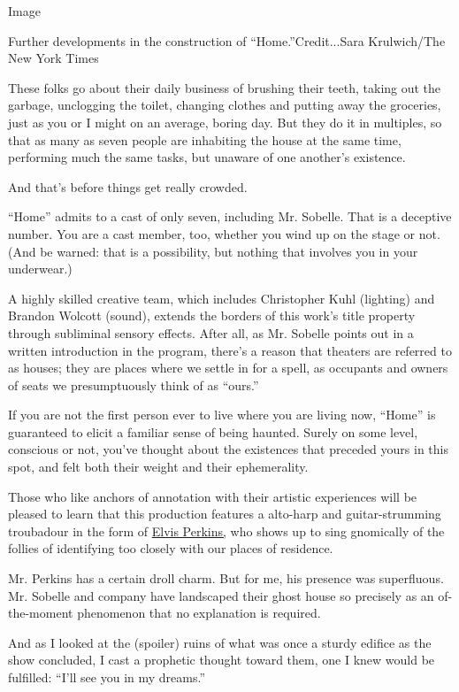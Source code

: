 Image

Further developments in the construction of ``Home.''Credit...Sara
Krulwich/The New York Times

These folks go about their daily business of brushing their teeth,
taking out the garbage, unclogging the toilet, changing clothes and
putting away the groceries, just as you or I might on an average, boring
day. But they do it in multiples, so that as many as seven people are
inhabiting the house at the same time, performing much the same tasks,
but unaware of one another's existence.

And that's before things get really crowded.

``Home'' admits to a cast of only seven, including Mr. Sobelle. That is
a deceptive number. You are a cast member, too, whether you wind up on
the stage or not. (And be warned: that is a possibility, but nothing
that involves you in your underwear.)

A highly skilled creative team, which includes Christopher Kuhl
(lighting) and Brandon Wolcott (sound), extends the borders of this
work's title property through subliminal sensory effects. After all, as
Mr. Sobelle points out in a written introduction in the program, there's
a reason that theaters are referred to as houses; they are places where
we settle in for a spell, as occupants and owners of seats we
presumptuously think of as ``ours.''

If you are not the first person ever to live where you are living now,
``Home'' is guaranteed to elicit a familiar sense of being haunted.
Surely on some level, conscious or not, you've thought about the
existences that preceded yours in this spot, and felt both their weight
and their ephemerality.

Those who like anchors of annotation with their artistic experiences
will be pleased to learn that this production features a alto-harp and
guitar-strumming troubadour in the form of
\href{http://www.elvisperkinssound.net/}{Elvis Perkins,} who shows up to
sing gnomically of the follies of identifying too closely with our
places of residence.

Mr. Perkins has a certain droll charm. But for me, his presence was
superfluous. Mr. Sobelle and company have landscaped their ghost house
so precisely as an of-the-moment phenomenon that no explanation is
required.

And as I looked at the (spoiler) ruins of what was once a sturdy edifice
as the show concluded, I cast a prophetic thought toward them, one I
knew would be fulfilled: ``I'll see you in my dreams.''


